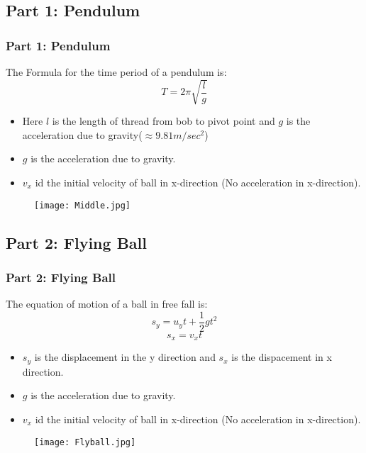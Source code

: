 \documentclass[]{beamer}%
\begin{document}
\subsection{Part 1: Pendulum}

\begin{frame}
\frametitle{Part 1: Pendulum}
\center
The Formula for the time period of a pendulum is: \pause
\begin{equation}
	T = 2\pi \sqrt {\frac{l}{g}}
\end{equation}
\begin{flushleft}
\begin{itemize}
\pause
\item Here $ l $ is the length of thread from bob to pivot point and $ g $ is the acceleration due to gravity($ \approx 9.81 m/sec^2 $)\pause
\item $ g $ is the acceleration due to gravity.\\ \pause
\item $ v_x $ id the initial velocity of ball in x-direction (No acceleration in x-direction).\pause
\end{itemize}
\end{flushleft}
\begin{figure}
		\texttt{[image: Middle.jpg]}
\end{figure}
\end{frame}

\subsection{Part 2: Flying Ball}

\begin{frame}
\frametitle{Part 2: Flying Ball}
\center
The equation of motion of a ball in free fall is: \\
\begin{equation}
	s_y = u_y t + \frac{1}{2}gt^2
\end{equation}
\begin{equation}
	s_x = v_x t
\end{equation}
\begin{flushleft}
\begin{itemize}
\item $ s_y $ is the displacement in the y direction and $ s_x $ is the dispacement in x direction.\pause \\
\item $ g $ is the acceleration due to gravity.\pause \\
\item $ v_x $ id the initial velocity of ball in x-direction (No acceleration in x-direction).\pause
\end{itemize}
\end{flushleft}
\begin{figure}
		\texttt{[image: Flyball.jpg]}
\end{figure}
\end{frame}
\end{document}
